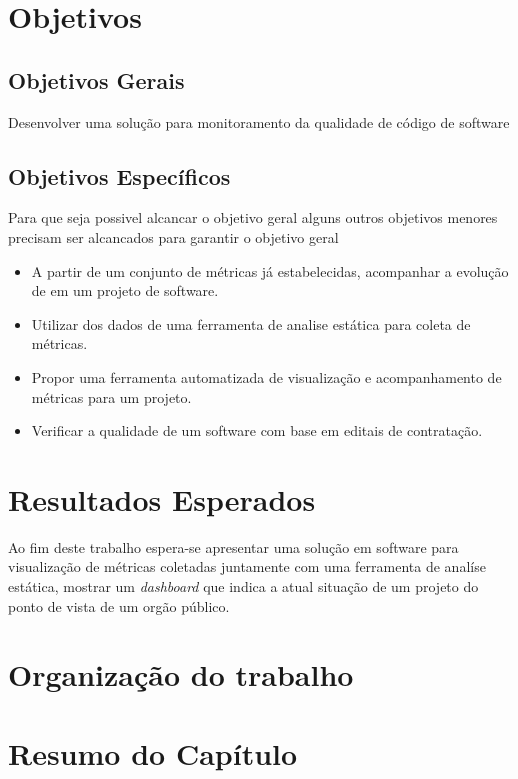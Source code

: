 	\section{Objetivos}

	\subsection{Objetivos Gerais} %
	\label{sub:objetivos_gerais}
	
		Desenvolver uma solução para monitoramento da qualidade de código de software


	\subsection{Objetivos Específicos} %
	\label{sub:objetivos_específicos}

	Para que seja possivel alcancar o objetivo geral alguns outros objetivos menores precisam ser alcancados para garantir  o objetivo geral 
		 
	\begin{itemize}
		\item A partir de um conjunto de métricas já estabelecidas, acompanhar a evolução de em um projeto de software.
		\item Utilizar dos dados de uma ferramenta de analise estática para coleta de métricas.  
		\item Propor uma ferramenta automatizada de visualização e acompanhamento de métricas para um projeto.
		\item Verificar a qualidade de um software com base em editais de contratação. 
	\end{itemize}
	
	
	\section{Resultados Esperados}

Ao fim deste trabalho espera-se apresentar uma solução em software para visualização de métricas coletadas  juntamente com uma ferramenta de analíse estática, mostrar um \textit{dashboard} que indica a atual situação de um projeto do ponto de vista de um orgão público. 

	\section{Organização do trabalho} %
	\label{sec:organização_do_trabalho} 	
	
	\section{Resumo do Capítulo}